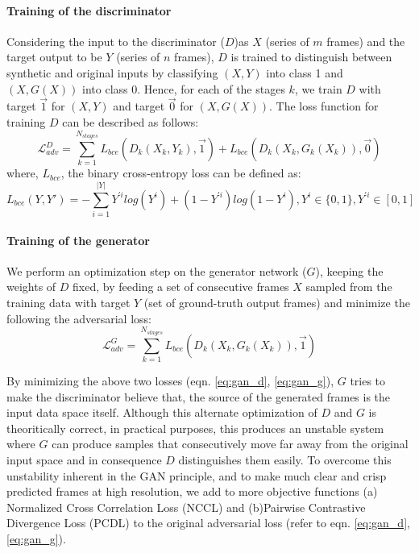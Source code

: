 \documentclass{article}
\begin{document}
  \paragraph{Training of the discriminator} Considering the input to the discriminator ($ D $)as $ X $ (series of $ m $ frames) and the target output to be $ Y $ (series of $ n $ frames), $ D $ is trained to distinguish between synthetic and original inputs by classifying $ (X, Y) $ into class 1 and $ (X, G(X)) $ into class 0. Hence, for each of the stages $ k $, we train $ D $ with target $ \vec{1} $ for $ (X, Y) $ and target $ \vec{0} $ for $ (X, G(X)) $. The loss function for training $ D $ can be described as follows:
  \begin{equation}
  	\mathcal{L}_{adv}^D = \sum_{k = 1}^{N_{stages}} L_{bce}(D_k(X_k, Y_k), \vec{1}) + L_{bce}(D_k(X_k, G_k(X_k)), \vec{0})
  	\label{eq:gan_d}
  \end{equation}
  where, $ L_{bce} $, the binary cross-entropy loss can be defined as:
  \begin{equation}
  	L_{bce}(Y, Y') = - \sum_{i = 1}^{|Y|} Y^{'i} log(Y^i) + (1 - Y^{'i}) log (1 - Y^i), Y^i \in \{0,1\}, Y^{'i} \in [0,1]
  	\label{eq:gan_bce} 
  \end{equation}
	
  \paragraph{Training of the generator} We perform an optimization step on the generator network ($ G $), keeping the weights of $ D $ fixed, by feeding a set of consecutive frames $ X $ sampled from the training data with target $ Y $ (set of ground-truth output frames) and minimize the following the adversarial loss:
  \begin{equation}
  	\mathcal{L}_{adv}^G = \sum_{k = 1}^{N_{stages}} L_{bce}(D_k(X_k, G_k(X_k)), \vec{1})
  	\label{eq:gan_g}
  \end{equation}
  
  By minimizing the above two losses (eqn. \ref{eq:gan_d}, \ref{eq:gan_g}), $ G $ tries to make the discriminator believe that, the source of the generated frames is the input data space itself. Although this alternate optimization of $ D $ and $ G $ is theoritically correct, in practical purposes, this produces an unstable system where $ G $ can produce samples that consecutively move far away from the original input space and in consequence $ D $ distinguishes them easily. To overcome this unstability inherent in the GAN principle, and to make much clear and crisp predicted frames at high resolution, we add to more objective functions (a) Normalized Cross Correlation Loss (NCCL) and (b)Pairwise Contrastive Divergence Loss (PCDL) to the original adversarial loss (refer to eqn. \ref{eq:gan_d},\ref{eq:gan_g}).  
\end{document}
